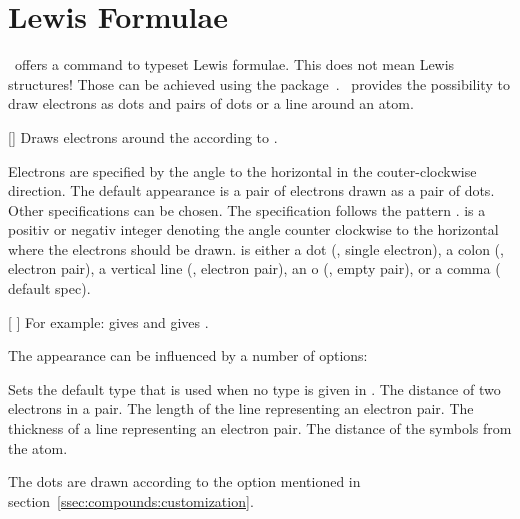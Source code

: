\documentclass[load-preamble+]{cnltx-doc}
\begin{document}
\section{Lewis Formulae}\label{sec:lewis-formulae}
\chemformula\ offers a command to typeset Lewis formulae.
This does not mean Lewis structures!  Those can be achieved using the
 package~\cite{pkg:chemfig}.  \chemformula\ provides the
possibility to draw electrons as dots and pairs of dots or a line around an
atom.

\begin{commands}
  []
    Draws electrons around the  according to .
\end{commands}

Electrons are specified by the angle to the horizontal in the couter-clockwise
direction.  The default appearance is a pair of electrons drawn as a pair of
dots.  Other specifications can be chosen.  The specification follows the
pattern .   is a positiv or negativ
integer denoting the angle counter clockwise to the horizontal where the
electrons should be drawn.   is either a dot (, single
electron), a colon (\code{:}, electron pair), a vertical line (\code{|},
electron pair), an o (, empty pair), or a comma (\code{,} default
spec).

\begin{commands}
  [%
    ]
    For example:  gives  and
     gives
    .
\end{commands}

The appearance can be influenced by a number of options:
\begin{options}
    Sets the default type that is used when no type is given in .
  \Default{1ex}
    The distance of two electrons in a pair.
  \Default{1.5ex}
    The length of the line representing an electron pair.
  \Default{1pt}
    The thickness of a line representing an electron pair.
  \Default{.5ex}
    The distance of the symbols from the atom.
\end{options}
The dots are drawn according to the  option mentioned
in section~\ref{ssec:compounds:customization}.
\end{document}
